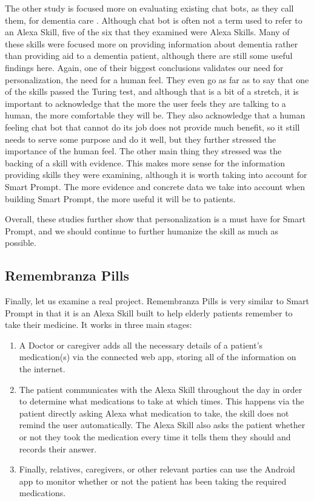 \documentclass[11pt, oneside]{article}
\begin{document}
The other study is focused more on evaluating existing chat bots, as they call them, for dementia care \cite{b5}. 
Although chat bot is often not a term used to refer to an Alexa Skill, five of the six that they examined were Alexa Skills. 
Many of these skills were focused more on providing information about dementia rather than providing aid to a dementia patient, although there are still some useful findings here. 
Again, one of their biggest conclusions validates our need for personalization, the need for a human feel. 
They even go as far as to say that one of the skills passed the Turing test, and although that is a bit of a stretch, it is important to acknowledge that the more the user feels they are talking to a human, the more comfortable they will be. 
They also acknowledge that a human feeling chat bot that cannot do its job does not provide much benefit, so it still needs to serve some purpose and do it well, but they further stressed the importance of the human feel. 
The other main thing they stressed was the backing of a skill with evidence. 
This makes more sense for the information providing skills they were examining, although it is worth taking into account for Smart Prompt. 
The more evidence and concrete data we take into account when building Smart Prompt, the more useful it will be to patients. 

Overall, these studies further show that personalization is a must have for Smart Prompt, and we should continue to further humanize the skill as much as possible. 

\subsection{Remembranza Pills}

Finally, let us examine a real project. 
Remembranza Pills \cite{b3} is very similar to Smart Prompt in that it is an Alexa Skill built to help elderly patients remember to take their medicine. 
It works in three main stages: 
\begin{enumerate}
  \item A Doctor or caregiver adds all the necessary details of a patient's medication(s) via the connected web app, storing all of the information on the internet.
  \item The patient communicates with the Alexa Skill throughout the day in order to determine what medications to take at which times. This happens via the patient directly asking Alexa what medication to take, the skill does not remind the user automatically. The Alexa Skill also asks the patient whether or not they took the medication every time it tells them they should and records their answer.
  \item Finally, relatives, caregivers, or other relevant parties can use the Android app to monitor whether or not the patient has been taking the required medications. 
\end{enumerate}
\end{document}
